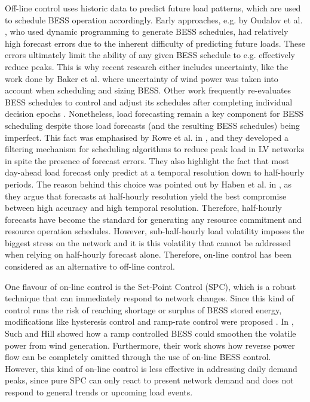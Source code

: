 Off-line control uses historic data to predict future load patterns, which are used to schedule BESS operation accordingly.
Early approaches, e.g. by Oudalov et al. \cite{Oudalov2007}, who used dynamic programming to generate BESS schedules, had relatively high forecast errors due to the inherent difficulty of predicting future loads.
These errors ultimately limit the ability of any given BESS schedule to e.g. effectively reduce peaks.
This is why recent research either includes uncertainty, like the work done by Baker et al. \cite{Baker2017} where uncertainty of wind power was taken into account when scheduling and sizing BESS.
Other work frequently re-evaluates BESS schedules to control and adjust its schedules after completing individual decision epochs \cite{Wang2014a}.
Nonetheless, load forecasting remain a key component for BESS scheduling despite those load forecasts (and the resulting BESS schedules) being imperfect.
This fact was emphasised by Rowe et al. in \cite{Rowe2014a}, and they developed a filtering mechanism for scheduling algorithms to reduce peak load in LV networks in spite the presence of forecast errors.
They also highlight the fact that most day-ahead load forecast only predict at a temporal resolution down to half-hourly periods.
The reason behind this choice was pointed out by Haben et al. in \cite{Poghosyan2014, Haben2014}, as they argue that forecasts at half-hourly resolution yield the best compromise between high accuracy and high temporal resolution.
Therefore, half-hourly forecasts have become the standard for generating any resource commitment and resource operation schedules.
However, sub-half-hourly load volatility imposes the biggest stress on the network and it is this volatility that cannot be addressed when relying on half-hourly forecast alone.
Therefore, on-line control has been considered as an alternative to off-line control.

One flavour of on-line control is the Set-Point Control (SPC), which is a robust technique that can immediately respond to network changes.
Since this kind of control runs the risk of reaching shortage or surplus of BESS stored energy, modifications like hysteresis control and ramp-rate control were proposed \cite{Gybel2012, Blaabjerg2006, Malesani1990, Such2012}.
In \cite{Such2012}, Such and Hill showed how a ramp controlled BESS could smoothen the volatile power from wind generation.
Furthermore, their work shows how reverse power flow can be completely omitted through the use of on-line BESS control.
However, this kind of on-line control is less effective in addressing daily demand peaks, since pure SPC can only react to present network demand and does not respond to general trends or upcoming load events.

